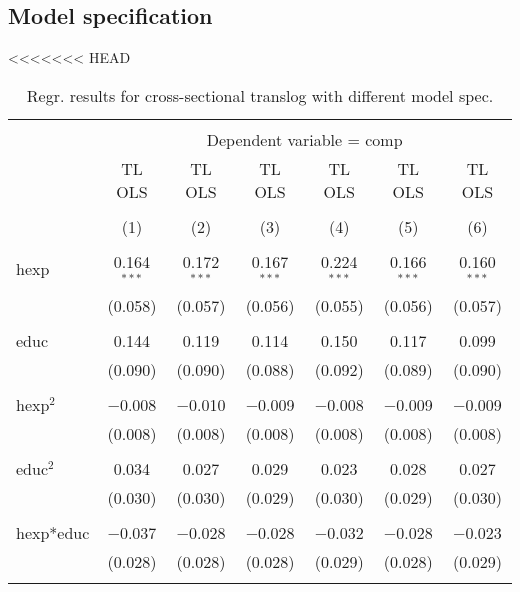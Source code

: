 \documentclass[12pt,a4paper]{article}\usepackage[]{graphicx}\usepackage[]{color}
\begin{document}
\subsection{Model specification}



<<<<<<< HEAD
\begin{table}[!htbp] \centering 
  \caption{Regr. results for cross-sectional translog with different model spec.} 
  \label{} 
\scriptsize 
\begin{tabular}{@{\extracolsep{5pt}}lcccccc} 
\\[-1.8ex]\hline 
\hline \\[-1.8ex] 
 & \multicolumn{6}{c}{Dependent variable = comp} \\ 
\cline{2-7} 
 & TL OLS & TL OLS & TL OLS & TL OLS & TL OLS & TL OLS \\ 
\\[-1.8ex] & (1) & (2) & (3) & (4) & (5) & (6)\\ 
\hline \\[-1.8ex] 
 hexp & 0.164$^{***}$ & 0.172$^{***}$ & 0.167$^{***}$ & 0.224$^{***}$ & 0.166$^{***}$ & 0.160$^{***}$ \\ 
  & (0.058) & (0.057) & (0.056) & (0.055) & (0.056) & (0.057) \\ 
  & & & & & & \\ 
 educ & 0.144 & 0.119 & 0.114 & 0.150 & 0.117 & 0.099 \\ 
  & (0.090) & (0.090) & (0.088) & (0.092) & (0.089) & (0.090) \\ 
  & & & & & & \\ 
 hexp$^2$ & $-$0.008 & $-$0.010 & $-$0.009 & $-$0.008 & $-$0.009 & $-$0.009 \\ 
  & (0.008) & (0.008) & (0.008) & (0.008) & (0.008) & (0.008) \\ 
  & & & & & & \\ 
 educ$^2$ & 0.034 & 0.027 & 0.029 & 0.023 & 0.028 & 0.027 \\ 
  & (0.030) & (0.030) & (0.029) & (0.030) & (0.029) & (0.030) \\ 
  & & & & & & \\ 
 hexp*educ & $-$0.037 & $-$0.028 & $-$0.028 & $-$0.032 & $-$0.028 & $-$0.023 \\ 
  & (0.028) & (0.028) & (0.028) & (0.029) & (0.028) & (0.029) \\ 
  & & & & & & \\ 

\end{tabular}
\end{table}
\end{document}
